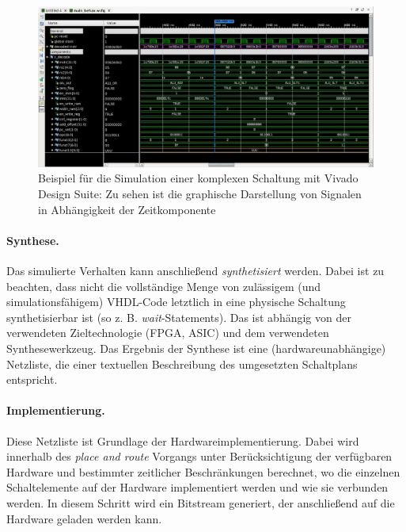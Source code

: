 \begin{figure} [ht]
  \centering
  \includegraphics[width=\textwidth]{Figures/simulation}
  \caption{Beispiel für die Simulation einer komplexen Schaltung mit Vivado Design Suite: Zu sehen ist die graphische Darstellung von Signalen in Abhängigkeit der Zeitkomponente}
  \label{fig:simulation}
\end{figure}

\paragraph{Synthese.} Das simulierte Verhalten kann anschließend \emph{synthetisiert} werden. Dabei ist zu beachten, dass nicht die vollständige Menge von zulässigem (und simulationsfähigem) VHDL-Code letztlich in eine physische Schaltung synthetisierbar ist (so z. B. \emph{wait}-Statements). Das ist abhängig von der verwendeten Zieltechnologie (FPGA, ASIC) und dem verwendeten Synthesewerkzeug. Das Ergebnis der Synthese ist eine (hardwareunabhängige) Netzliste, die einer textuellen Beschreibung des umgesetzten Schaltplans entspricht.

\paragraph{Implementierung.} Diese Netzliste ist Grundlage der Hardwareimplementierung. Dabei wird innerhalb des \emph{place and route} Vorgangs unter Berücksichtigung der verfügbaren Hardware und bestimmter zeitlicher Beschränkungen berechnet, wo die einzelnen Schaltelemente auf der Hardware implementiert werden und wie sie verbunden werden. In diesem Schritt wird ein Bitstream generiert, der anschließend auf die Hardware geladen werden kann. \cite[S. 21]{SynthesisFPGA}
